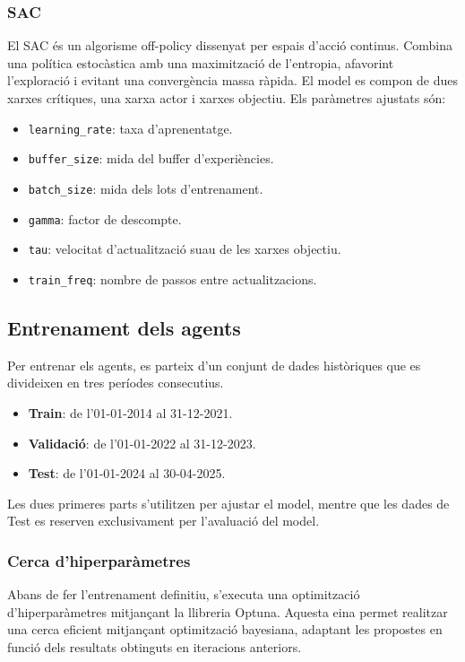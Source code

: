 \documentclass[12pt,a4paper,twoside]{book}
\begin{document}
\subsubsection{SAC}

El SAC és un algorisme off-policy dissenyat per espais d'acció continus. Combina una política estocàstica amb una maximització de l'entropia, afavorint l'exploració i evitant una convergència massa ràpida. El model es compon de dues xarxes crítiques, una xarxa actor i xarxes objectiu. Els paràmetres ajustats són:

\begin{itemize}
    \item \texttt{learning\_rate}: taxa d'aprenentatge.
    \item \texttt{buffer\_size}: mida del buffer d'experiències.
    \item \texttt{batch\_size}: mida dels lots d'entrenament.
    \item \texttt{gamma}: factor de descompte.
    \item \texttt{tau}: velocitat d'actualització suau de les xarxes objectiu.
    \item \texttt{train\_freq}: nombre de passos entre actualitzacions.
\end{itemize}


\subsection{Entrenament dels agents}
Per entrenar els agents, es parteix d'un conjunt de dades històriques que es divideixen en tres períodes consecutius.
\begin{itemize}
\item \textbf{Train}: de l'01-01-2014 al 31-12-2021.
\item \textbf{Validació}: de l'01-01-2022 al 31-12-2023.
\item \textbf{Test}: de l'01-01-2024 al 30-04-2025.
\end{itemize}

Les dues primeres parts s'utilitzen per ajustar el model, mentre que les dades de Test es reserven exclusivament per l'avaluació del model.

\subsubsection{Cerca d'hiperparàmetres}
Abans de fer l'entrenament definitiu, s'executa una optimització d'hiperparàmetres mitjançant la llibreria Optuna. Aquesta eina permet realitzar una cerca eficient mitjançant optimització bayesiana, adaptant les propostes en funció dels resultats obtinguts en iteracions anteriors.
\end{document}
